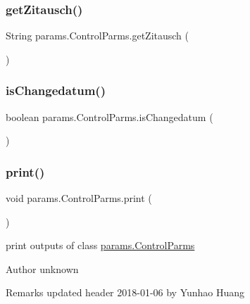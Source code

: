 \subsubsection{\texorpdfstring{get\+Zitausch()}{getZitausch()}}
{\footnotesize\ttfamily String params.\+Control\+Parms.\+get\+Zitausch (\begin{DoxyParamCaption}{ }\end{DoxyParamCaption})}

\mbox{\label{classparams_1_1_control_parms_ab1496ac78857153a556b98b357595e1b}} 
\subsubsection{\texorpdfstring{is\+Changedatum()}{isChangedatum()}}
{\footnotesize\ttfamily boolean params.\+Control\+Parms.\+is\+Changedatum (\begin{DoxyParamCaption}{ }\end{DoxyParamCaption})}

\mbox{\label{classparams_1_1_control_parms_af1a625fc2adabd5ec8a2af31f93d3278}} 
\subsubsection{\texorpdfstring{print()}{print()}}
{\footnotesize\ttfamily void params.\+Control\+Parms.\+print (\begin{DoxyParamCaption}{ }\end{DoxyParamCaption})}



print outputs of class \hyperlink{classparams_1_1_control_parms}{params.\+Control\+Parms} 

\begin{DoxyAuthor}{Author}
unknown 
\end{DoxyAuthor}
\begin{DoxyRemark}{Remarks}
updated header 2018-\/01-\/06 by Yunhao Huang 
\end{DoxyRemark}
\mbox{\label{classparams_1_1_control_parms_ae4add7088c814512790397af2e582997}} 
